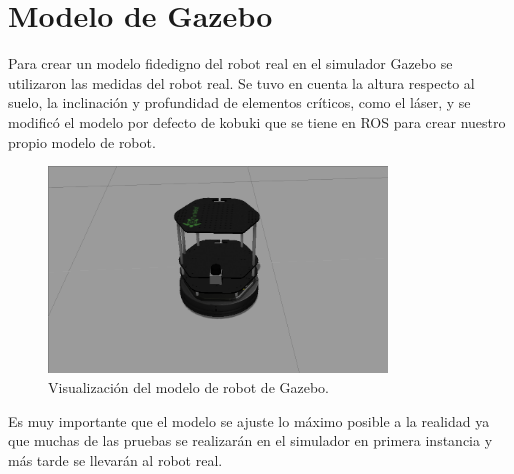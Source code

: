 \section{Modelo de Gazebo}
\label{cap:modelodegazebo}
Para crear un modelo fidedigno del robot real en el simulador Gazebo se utilizaron las medidas del robot real. Se tuvo en cuenta la altura respecto al suelo, la inclinación y profundidad de elementos críticos, como el láser, y se modificó el modelo por defecto de kobuki que se tiene en ROS para crear nuestro propio modelo de robot.

\begin{figure} [hbtp]
  \begin{center}
    \includegraphics[width=9cm]{img/cap4/modelogazebo}
  \end{center}
  \caption{Visualización del modelo de robot de Gazebo.}
  \label{fig:modelogazebo}
\end{figure}


Es muy importante que el modelo se ajuste lo máximo posible a la realidad ya que muchas de las pruebas se realizarán en el simulador en primera instancia y más tarde se llevarán al robot real.

